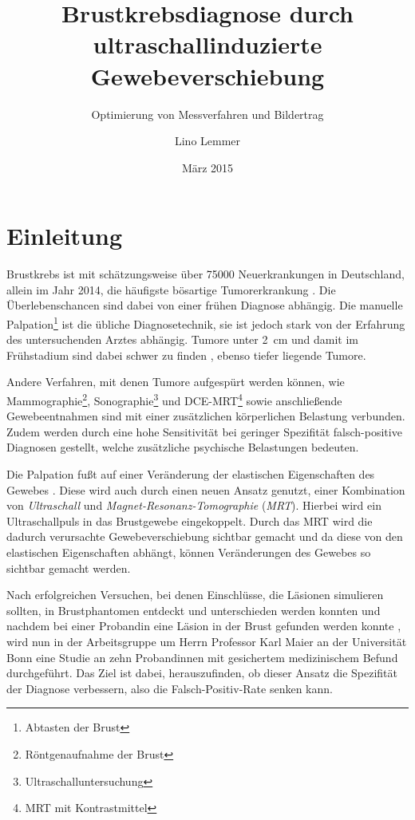 \documentclass[
    11pt,
    ngerman
]{scrbook}
\author{Lino Lemmer}
\title{Brustkrebsdiagnose durch ultraschallinduzierte Gewebeverschiebung}
\subtitle{Optimierung von Messverfahren und Bildertrag}
\date{März 2015}
\begin{document}
\maketitle


\tableofcontents

\chapter{Einleitung}

Brustkrebs ist mit schätzungsweise über \num{75000} Neuerkrankungen in
Deutschland, allein im Jahr 2014, die häufigste bösartige Tumorerkrankung
\parencite[68]{krebs_in_deutschland}. Die Überlebenschancen sind dabei von
einer frühen Diagnose abhängig. Die manuelle Palpation\footnote{Abtasten der
Brust} ist die übliche Diagnosetechnik, sie ist jedoch stark von der Erfahrung
des untersuchenden Arztes abhängig. Tumore unter \SI{2}{\centi\meter} und
damit im Frühstadium sind dabei schwer zu finden
\parencite{diagnostik_mammakarzinom}, ebenso tiefer liegende Tumore.

Andere Verfahren, mit denen Tumore aufgespürt werden können, wie
Mammographie\footnote{Röntgenaufnahme der Brust},
Sonographie\footnote{Ultraschalluntersuchung} und DCE-MRT\footnote{MRT mit
Kontrastmittel} sowie anschließende Gewebeentnahmen sind mit einer
zusätzlichen körperlichen Belastung verbunden. Zudem werden durch eine hohe
Sensitivität bei geringer Spezifität falsch-positive Diagnosen gestellt,
welche zusätzliche psychische Belastungen bedeuten.

Die Palpation fußt auf einer Veränderung der elastischen Eigenschaften des
Gewebes \parencite{elastic_moduli_breast_tissue}.  Diese wird auch durch einen
neuen Ansatz genutzt, einer Kombination von \emph{Ultraschall} und
\emph{Magnet-Resonanz-Tomographie} (\emph{MRT}). Hierbei wird ein
Ultraschallpuls in das Brustgewebe eingekoppelt. Durch das MRT wird die
dadurch verursachte Gewebeverschiebung sichtbar gemacht und da diese von den
elastischen Eigenschaften abhängt, können Veränderungen des Gewebes so
sichtbar gemacht werden.

Nach erfolgreichen Versuchen, bei denen Einschlüsse, die Läsionen simulieren
sollten, in Brustphantomen entdeckt und unterschieden werden konnten
\parencite{dipl_ulucay} und nachdem bei einer Probandin eine Läsion in der
Brust gefunden werden konnte \parencite{diss_mende}, wird nun in der
Arbeitsgruppe um Herrn Professor Karl Maier an der Universität Bonn eine Studie
an zehn Probandinnen mit gesichertem medizinischem Befund durchgeführt. Das
Ziel ist dabei, herauszufinden, ob dieser Ansatz die Spezifität der Diagnose
verbessern, also die Falsch-Positiv-Rate senken kann.
\end{document}
